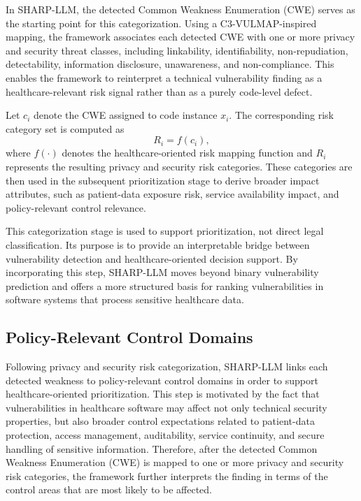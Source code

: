 \documentclass[conference]{IEEEtran}
\begin{document}
In SHARP-LLM, the detected Common Weakness Enumeration (CWE) serves as the starting point for this categorization. Using a C3-VULMAP-inspired mapping, the framework associates each detected CWE with one or more privacy and security threat classes, including linkability, identifiability, non-repudiation, detectability, information disclosure, unawareness, and non-compliance. This enables the framework to reinterpret a technical vulnerability finding as a healthcare-relevant risk signal rather than as a purely code-level defect.

Let $c_i$ denote the CWE assigned to code instance $x_i$. The corresponding risk category set is computed as
\begin{equation}
R_i = f(c_i),
\end{equation}
where $f(\cdot)$ denotes the healthcare-oriented risk mapping function and $R_i$ represents the resulting privacy and security risk categories. These categories are then used in the subsequent prioritization stage to derive broader impact attributes, such as patient-data exposure risk, service availability impact, and policy-relevant control relevance.

This categorization stage is used to support prioritization, not direct legal classification. Its purpose is to provide an interpretable bridge between vulnerability detection and healthcare-oriented decision support. By incorporating this step, SHARP-LLM moves beyond binary vulnerability prediction and offers a more structured basis for ranking vulnerabilities in software systems that process sensitive healthcare data.

\subsection{Policy-Relevant Control Domains}
Following privacy and security risk categorization, SHARP-LLM links each detected weakness to policy-relevant control domains in order to support healthcare-oriented prioritization. This step is motivated by the fact that vulnerabilities in healthcare software may affect not only technical security properties, but also broader control expectations related to patient-data protection, access management, auditability, service continuity, and secure handling of sensitive information. Therefore, after the detected Common Weakness Enumeration (CWE) is mapped to one or more privacy and security risk categories, the framework further interprets the finding in terms of the control areas that are most likely to be affected.
\end{document}
